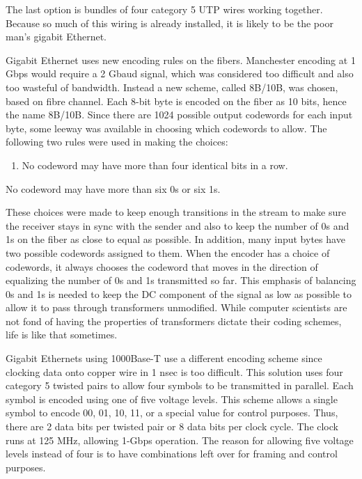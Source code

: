 \documentclass[b5paper,11pt]{memoir}
\begin{document}
The last option is bundles of four category 5 UTP wires working
together. Because so much of this wiring is already installed, it is
likely to be the poor man's gigabit Ethernet.

Gigabit Ethernet uses new encoding rules on the fibers. Manchester
encoding at 1 Gbps would require a 2 Gbaud signal, which was considered
too difficult and also too wasteful of bandwidth. Instead a new scheme,
called {8B/10B}, was chosen, based on fibre channel. Each 8-bit byte is
encoded on the fiber as 10 bits, hence the name 8B/10B. Since there are
1024 possible output codewords for each input byte, some leeway was
available in choosing which codewords to allow. The following two rules
were used in making the choices:

{}

\begin{enumerate}
\def\labelenumi{\arabic{enumi}.}
\item
  {}

  No codeword may have more than four identical bits in a row.
\end{enumerate}

{}

No codeword may have more than six 0s or six 1s.

These choices were made to keep enough transitions in the stream to make
sure the receiver stays in sync with the sender and also to keep the
number of 0s and 1s on the fiber as close to equal as possible. In
addition, many input bytes have two possible codewords assigned to them.
When the encoder has a choice of codewords, it always chooses the
codeword that moves in the direction of equalizing the number of 0s and
1s transmitted so far. This emphasis of balancing 0s and 1s is needed to
keep the DC component of the signal as low as possible to allow it to
pass through transformers unmodified. While computer scientists are not
fond of having the properties of transformers dictate their coding
schemes, life is like that sometimes.

Gigabit Ethernets using 1000Base-T use a different encoding scheme since
clocking data onto copper wire in 1 nsec is too difficult. This solution
uses four category 5 twisted pairs to allow four symbols to be
transmitted in parallel. Each symbol is encoded using one of five
voltage levels. This scheme allows a single symbol to encode 00, 01, 10,
11, or a special value for control purposes. Thus, there are 2 data bits
per twisted pair or 8 data bits per clock cycle. The clock runs at 125
MHz, allowing 1-Gbps operation. The reason for allowing five voltage
levels instead of four is to have combinations left over for framing and
control purposes.
\end{document}
